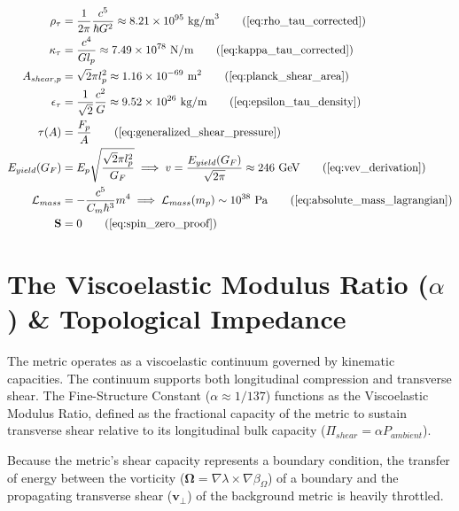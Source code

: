 \begin{tcolorbox}[recallbox, title={\ref{box:continuum_constants}. Constants \& Scale Invariance}]
\begin{align}
    \rho_{\tau} &= \frac{1}{2\pi} \frac{c^5}{\hbar G^2} \approx 8.21 \times 10^{95} \text{ kg/m}^3 \tag{\ref{eq:rho_tau_corrected}} \\
    \kappa_{\tau} &= \frac{c^4}{G l_p} \approx 7.49 \times 10^{78} \text{ N/m} \tag{\ref{eq:kappa_tau_corrected}} \\
    A_{shear, p} &= \sqrt{2}\pi l_p^2 \approx 1.16 \times 10^{-69} \text{ m}^2 \tag{\ref{eq:planck_shear_area}} \\
    \epsilon_{\tau} &= \frac{1}{\sqrt{2}} \frac{c^2}{G} \approx 9.52 \times 10^{26} \text{ kg/m} \tag{\ref{eq:epsilon_tau_density}} \\
    \tau(A) &= \frac{F_p}{A} \tag{\ref{eq:generalized_shear_pressure}} \\
    E_{yield}(G_F) &= E_p \sqrt{\frac{\sqrt{2}\pi l_p^2}{G_F}} \implies v = \frac{E_{yield}(G_F)}{\sqrt{2\pi}} \approx 246 \text{ GeV} \tag{\ref{eq:vev_derivation}} \\
    \mathcal{L}_{mass} &= - \frac{c^5}{C_m \hbar^3} m^4 \implies \mathcal{L}_{mass}(m_p) \sim 10^{38} \text{ Pa} \tag{\ref{eq:absolute_mass_lagrangian}} \\
    \mathbf{S} &= 0 \tag{\ref{eq:spin_zero_proof}}
\end{align}
\end{tcolorbox}

\section{The Viscoelastic Modulus Ratio ($\alpha$) \& Topological Impedance}
\label{sec:deriv_fine_structure2}

The metric operates as a viscoelastic continuum governed by kinematic capacities. The continuum supports both longitudinal compression and transverse shear. The Fine-Structure Constant ($\alpha \approx 1/137$) functions as the Viscoelastic Modulus Ratio, defined as the fractional capacity of the metric to sustain transverse shear relative to its longitudinal bulk capacity ($\Pi_{shear} = \alpha P_{ambient}$). 

Because the metric's shear capacity represents a boundary condition, the transfer of energy between the vorticity ($\boldsymbol{\Omega} = \nabla\lambda \times \nabla\beta_\Omega$) of a boundary and the propagating transverse shear ($\mathbf{v}_{\perp}$) of the background metric is heavily throttled.

